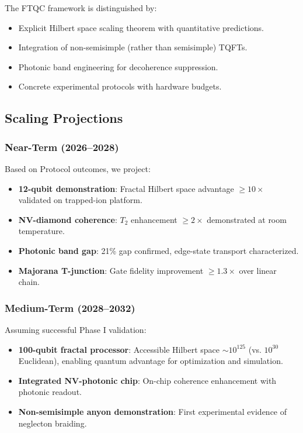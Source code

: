 The FTQC framework is distinguished by:
\begin{itemize}
\item Explicit Hilbert space scaling theorem with quantitative predictions.
\item Integration of non-semisimple (rather than semisimple) TQFTs.
\item Photonic band engineering for decoherence suppression.
\item Concrete experimental protocols with hardware budgets.
\end{itemize}

\subsection{Scaling Projections}

\subsubsection{Near-Term (2026--2028)}

Based on Protocol outcomes, we project:
\begin{itemize}
\item \textbf{12-qubit demonstration}: Fractal Hilbert space advantage $\geq 10\times$ validated on trapped-ion platform.
\item \textbf{NV-diamond coherence}: $T_2$ enhancement $\geq 2\times$ demonstrated at room temperature.
\item \textbf{Photonic band gap}: 21\% gap confirmed, edge-state transport characterized.
\item \textbf{Majorana T-junction}: Gate fidelity improvement $\geq 1.3\times$ over linear chain.
\end{itemize}

\subsubsection{Medium-Term (2028--2032)}

Assuming successful Phase I validation:
\begin{itemize}
\item \textbf{100-qubit fractal processor}: Accessible Hilbert space $\sim 10^{125}$ (vs. $10^{30}$ Euclidean), enabling quantum advantage for optimization and simulation.
\item \textbf{Integrated NV-photonic chip}: On-chip coherence enhancement with photonic readout.
\item \textbf{Non-semisimple anyon demonstration}: First experimental evidence of neglecton braiding.
\end{itemize}

